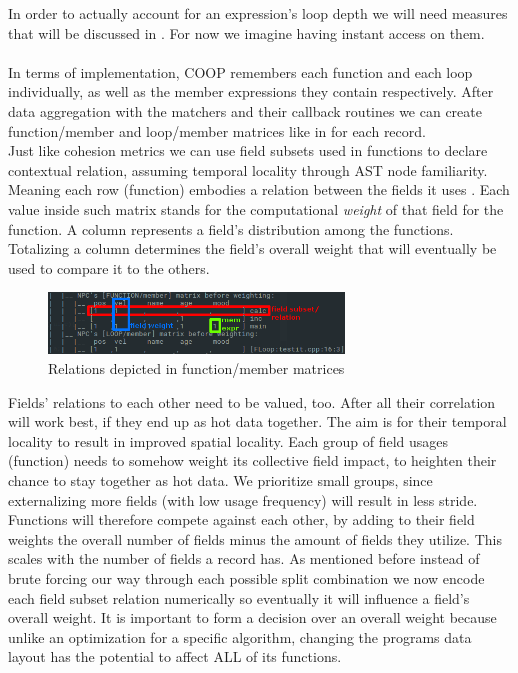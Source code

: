 In order to actually account for an expression's loop depth we will need measures that will be discussed in . For now we imagine having instant access on them.\\\\
In terms of implementation, COOP remembers each function and each loop individually, as well as the member expressions they contain respectively. After data aggregation with the matchers and their callback routines we can create function/member and loop/member matrices like in  for each record.\\
Just like cohesion metrics we can use field subsets used in functions to declare contextual relation, assuming temporal locality through AST node familiarity. Meaning each row (function) embodies a relation between the fields it uses . Each value inside such matrix stands for the computational \textit{weight} of that field for the function. A column represents a field's distribution among the functions. Totalizing a column determines the field's overall weight that will eventually be used to compare it to the others.
\begin{figure}[!htbp]
	\centering
	\includegraphics[width=0.7\textwidth, height=0.2\textwidth]{PICs/npc_crosscheck_matrix_relations}
	\caption{Relations depicted in function/member matrices}\label{npc_crosscheck_matrix_relations}
\end{figure}
Fields' relations to each other need to be valued, too. After all their correlation will work best, if they end up as hot data together. The aim is for their temporal locality to result in improved spatial locality. Each group of field usages (function) needs to somehow weight its collective field impact, to heighten their chance to stay together as hot data. We prioritize small groups, since externalizing more fields (with low usage frequency) will result in less stride. Functions will therefore compete against each other, by adding to their field weights the overall number of fields minus the amount of fields they utilize. This scales with the number of fields a record has. As mentioned before instead of brute forcing our way through each possible split combination we now encode each field subset relation numerically so eventually it will influence a field's overall weight. It is important to form a decision over an overall weight because unlike an optimization for a specific algorithm, changing the programs data layout has the potential to affect ALL of its functions.

